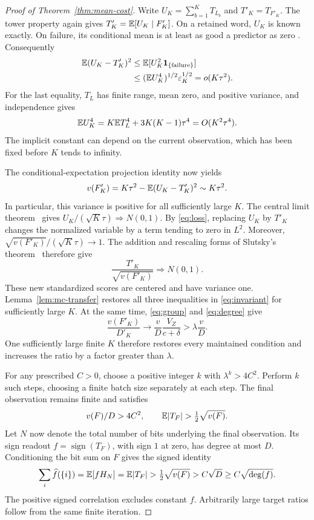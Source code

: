 \begin{proof}[Proof of Theorem~\ref{thm:mean-cost}]
Write $U_K=\sum_{b=1}^KT_{L_b}$ and $T'_K=T_{F'_K}$.
The tower property again gives $T'_K=\mathbb E[U_K\mid F'_K]$.
On a retained word, $U_K$ is known exactly.  On failure, its conditional
mean is at least as good a predictor as zero
\cite[Theorem~4.1.15]{Durrett}.  Consequently
\begin{align}
 \mathbb E(U_K-T'_K)^2
 &\le\mathbb E[U_K^2\mathbf 1_{\{\mathrm{failure}\}}]\notag\\
 &\le(\mathbb E U_K^4)^{1/2}\varepsilon_K^{1/2}
   =o(K\tau^2). \label{eq:loss}
\end{align}
For the last equality, $T_L$ has finite range, mean zero, and positive
variance, and independence gives
\[
 \mathbb E U_K^4=K\mathbb E T_L^4+3K(K-1)\tau^4=O(K^2\tau^4).
\]
The implicit constant can depend on the current observation, which
has been fixed before $K$ tends to infinity.

The conditional-expectation projection identity
\cite[Theorem~4.1.15 and its proof]{Durrett} now yields
\[
 v(F'_K)=K\tau^2-\mathbb E(U_K-T'_K)^2\sim K\tau^2.
\]
In particular, this variance is positive for all sufficiently large
$K$.  The central limit theorem~\cite[Theorem~3.4.1]{Durrett} gives
$U_K/(\sqrt K\tau)\Rightarrow N(0,1)$.  By \eqref{eq:loss}, replacing
$U_K$ by $T'_K$ changes the normalized variable by a term tending to
zero in $L^2$.  Moreover,
$\sqrt{v(F'_K)}/(\sqrt K\tau)\to1$.  The addition and rescaling forms of
Slutsky's theorem~\cite[Exercises~3.2.13--3.2.14]{Durrett} therefore give
\[
 \frac{T'_K}{\sqrt{v(F'_K)}}\Rightarrow N(0,1).
\]
These new standardized scores are centered and have variance one.
Lemma~\ref{lem:mc-transfer} restores all three inequalities in
\eqref{eq:invariant} for sufficiently large $K$.  At the same time,
\eqref{eq:group} and \eqref{eq:degree} give
\[
 \frac{v(F'_K)}{D'_K}\longrightarrow
 \frac vD\frac{V_Z}{c+\delta}>\lambda\frac vD.
\]
One sufficiently large finite $K$ therefore restores every maintained
condition and increases the ratio by a factor greater than $\lambda$.

For any prescribed $C>0$, choose a positive integer $k$ with
$\lambda^k>4C^2$.  Perform $k$ such steps, choosing a finite batch
size separately at each step.  The final observation remains finite
and satisfies
\[
 v(F)/D>4C^2,\qquad \E|T_F|>\tfrac12\sqrt{v(F)}.
\]
Let $N$ now denote the total number of bits underlying the final
observation.  Its sign readout $f=\operatorname{sign}(T_F)$, with sign $1$ at zero,
has degree at most $D$.  Conditioning the bit sum on $F$ gives the
signed identity
\[
 \sum_i\widehat f(\{i\})=\mathbb E[fH_N]=\mathbb E|T_F|
 >\tfrac12\sqrt{v(F)}>C\sqrt D\ge C\sqrt{\deg(f)}.
\]
The positive signed correlation excludes constant $f$.  Arbitrarily
large target ratios follow from the same finite iteration.
\end{proof}


